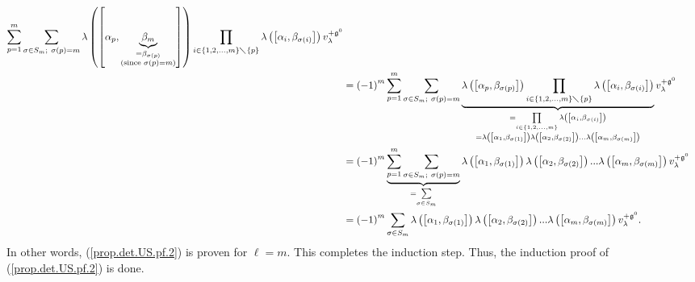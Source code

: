 \documentclass
[numbers=enddot,12pt,final,onecolumn,german,notitlepage]{scrartcl}%
\theoremstyle{definition}
\begin{document}
\begin{align*}
\sum\limits_{p=1}^{m}\sum\limits_{\sigma\in S_{m};\ \sigma\left(  p\right)
=m}\lambda\left(  \left[  \alpha_{p},\underbrace{\beta_{m}}_{\substack{=\beta
_{\sigma\left(  p\right)  }\\\text{(since }\sigma\left(  p\right)  =m\text{)}%
}}\right]  \right)  \prod\limits_{i\in\left\{  1,2,...,m\right\}
\diagdown\left\{  p\right\}  }\lambda\left(  \left[  \alpha_{i},\beta
_{\sigma\left(  i\right)  }\right]  \right)  v_{\lambda}^{+\mathfrak{g}^{0}}\\
&  =\left(  -1\right)  ^{m}\sum\limits_{p=1}^{m}\sum\limits_{\sigma\in
S_{m};\ \sigma\left(  p\right)  =m}\underbrace{\lambda\left(  \left[
\alpha_{p},\beta_{\sigma\left(  p\right)  }\right]  \right)  \prod
\limits_{i\in\left\{  1,2,...,m\right\}  \diagdown\left\{  p\right\}  }%
\lambda\left(  \left[  \alpha_{i},\beta_{\sigma\left(  i\right)  }\right]
\right)  }_{\substack{=\prod\limits_{i\in\left\{  1,2,...,m\right\}  }%
\lambda\left(  \left[  \alpha_{i},\beta_{\sigma\left(  i\right)  }\right]
\right)  \\=\lambda\left(  \left[  \alpha_{1},\beta_{\sigma\left(  1\right)
}\right]  \right)  \lambda\left(  \left[  \alpha_{2},\beta_{\sigma\left(
2\right)  }\right]  \right)  ...\lambda\left(  \left[  \alpha_{m}%
,\beta_{\sigma\left(  m\right)  }\right]  \right)  }}v_{\lambda}%
^{+\mathfrak{g}^{0}}\\
&  =\left(  -1\right)  ^{m}\underbrace{\sum\limits_{p=1}^{m}\sum
\limits_{\sigma\in S_{m};\ \sigma\left(  p\right)  =m}}_{=\sum\limits_{\sigma
\in S_{m}}}\lambda\left(  \left[  \alpha_{1},\beta_{\sigma\left(  1\right)
}\right]  \right)  \lambda\left(  \left[  \alpha_{2},\beta_{\sigma\left(
2\right)  }\right]  \right)  ...\lambda\left(  \left[  \alpha_{m}%
,\beta_{\sigma\left(  m\right)  }\right]  \right)  v_{\lambda}^{+\mathfrak{g}%
^{0}}\\
&  =\left(  -1\right)  ^{m}\sum\limits_{\sigma\in S_{m}}\lambda\left(  \left[
\alpha_{1},\beta_{\sigma\left(  1\right)  }\right]  \right)  \lambda\left(
\left[  \alpha_{2},\beta_{\sigma\left(  2\right)  }\right]  \right)
...\lambda\left(  \left[  \alpha_{m},\beta_{\sigma\left(  m\right)  }\right]
\right)  v_{\lambda}^{+\mathfrak{g}^{0}}.
\end{align*}
In other words, (\ref{prop.det.US.pf.2}) is proven for $\ell=m$. This
completes the induction step. Thus, the induction proof of
(\ref{prop.det.US.pf.2}) is done.
\end{document}
